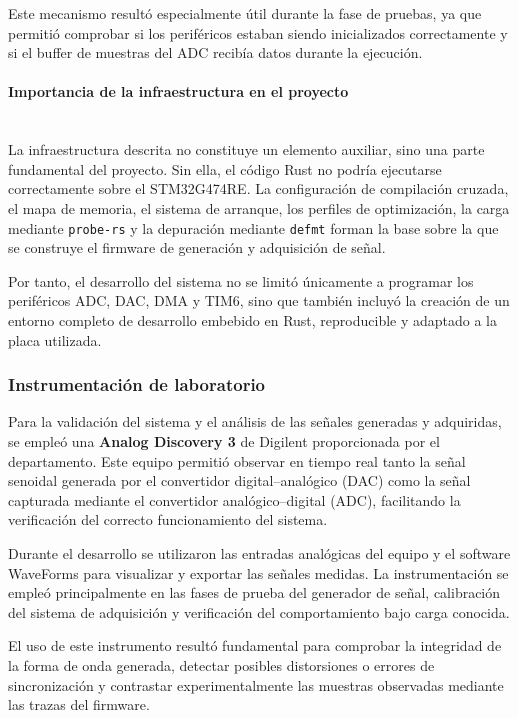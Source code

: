 \documentclass[11pt,a4paper]{article}
\newcommand{\myparagraph}[1]{\paragraph{#1}\mbox{}\\}
\begin{document}
Este mecanismo resultó especialmente útil durante la fase de pruebas, ya que permitió comprobar si los periféricos estaban siendo inicializados correctamente y si el buffer de muestras del ADC recibía datos durante la ejecución.

\myparagraph{Importancia de la infraestructura en el proyecto}

La infraestructura descrita no constituye un elemento auxiliar, sino una parte fundamental del proyecto. Sin ella, el código Rust no podría ejecutarse correctamente sobre el STM32G474RE. La configuración de compilación cruzada, el mapa de memoria, el sistema de arranque, los perfiles de optimización, la carga mediante \texttt{probe-rs} y la depuración mediante \texttt{defmt} forman la base sobre la que se construye el firmware de generación y adquisición de señal.

Por tanto, el desarrollo del sistema no se limitó únicamente a programar los periféricos ADC, DAC, DMA y TIM6, sino que también incluyó la creación de un entorno completo de desarrollo embebido en Rust, reproducible y adaptado a la placa utilizada.

\subsubsection{Instrumentación de laboratorio}

Para la validación del sistema y el análisis de las señales generadas y adquiridas, se empleó una \textbf{Analog Discovery 3} de Digilent proporcionada por el departamento. Este equipo permitió observar en tiempo real tanto la señal senoidal generada por el convertidor digital--analógico (DAC) como la señal capturada mediante el convertidor analógico--digital (ADC), facilitando la verificación del correcto funcionamiento del sistema.

Durante el desarrollo se utilizaron las entradas analógicas del equipo y el software WaveForms para visualizar y exportar las señales medidas. La instrumentación se empleó principalmente en las fases de prueba del generador de señal, calibración del sistema de adquisición y verificación del comportamiento bajo carga conocida.

El uso de este instrumento resultó fundamental para comprobar la integridad de la forma de onda generada, detectar posibles distorsiones o errores de sincronización y contrastar experimentalmente las muestras observadas mediante las trazas del firmware.
\end{document}

